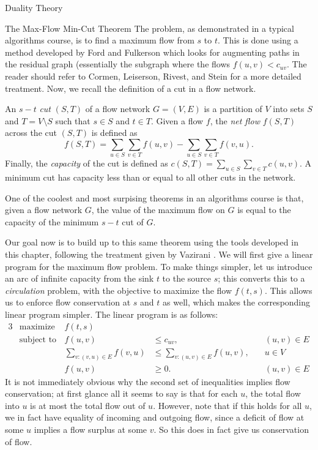 \begin{section}{Duality Theory}
\begin{subsection}{The Max-Flow Min-Cut Theorem}
	The problem, as demonstrated in a typical algorithms course, is to find a maximum flow from $s$ 
	to $t$. This is done using a method developed by Ford and Fulkerson which looks for augmenting 
	paths in the residual graph (essentially the subgraph where the flows $f(u,v) < c_{uv}$. 
	The reader should refer to Cormen, Leiserson, Rivest, and Stein 
	\cite{cormen2009introduction} for a more detailed treatment.
	Now, we recall the definition of a cut in a flow network.
	\begin{definition}
		An $s-t$ \emph{cut} $(S,T)$ of a flow network $G=(V,E)$ is a partition of $V$ into 
		sets $S$ and $T = V\setminus S$ such that $s\in S$ and $t\in T$. Given a flow $f$, the 
		\emph{net flow} $f(S,T)$ across the cut $(S,T)$ is defined as 
		\[
			f(S,T) = \sum_{u\in S} \sum_{v\in T} f(u,v) - \sum_{u\in S} \sum_{v\in T} 
			f(v,u).
		\]
		Finally, the \emph{capacity} of the cut is defined as $c(S,T) = 
		\sum_{u\in S} \sum_{v\in T} c(u,v)$. A minimum cut has capacity less than or equal to 
		all other cuts in the network.
	\end{definition}
	One of the coolest and most surpising theorems in an algorithms course is that, given a flow 
	network $G$, the value of the maximum flow on $G$ is equal to the capacity of the minimum 
	$s-t$ cut of $G$.

	Our goal now is to build up to this same theorem using the tools developed in this chapter,
	following the treatment given by Vazirani \cite{vazirani2002approximation}. 
	We will first give a linear program for the 
	maximum flow problem. To make things simpler, let us introduce an arc of infinite capacity 
	from the sink $t$ to the source $s$; this converts this to a \emph{circulation} problem, 
	with the objective to maximize the flow $f(t,s)$. This allows us to enforce flow conservation 
	at $s$ and $t$ as well, which makes the corresponding linear program simpler. The linear 
	program is as follows:
	\begin{alignat}{3}
		& \text{maximize } & f(t,s)\\
		& \text{subject to } & f(u,v) &\leq c_{uv}, &\quad (u,v)\in E\\ 
				     && \sum_{v:(v,u)\in E} f(v,u) & \leq \sum_{v:(u,v)\in E} f(u,v), &
				     	\quad u\in V &\\
				     && f(u,v) &\geq 0. &\quad (u,v)\in E &
	\end{alignat}
	It is not immediately obvious why the second set of inequalities implies flow conservation; 
	at first glance all 
	it seems to say is that for each $u$, the total flow into $u$ is at most the total flow out 
	of $u$. However, note that if this holds for all $u$, we in fact have equality of incoming and 
	outgoing flow, since a deficit of flow at some $u$ implies a flow surplus at some $v$. So 
	this does in fact give us conservation of flow. 
	

\end{subsection}
\end{section}
